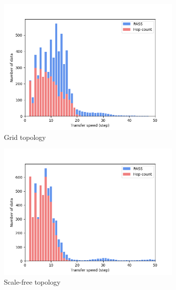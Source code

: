 \begin{figure}
    \centering
    \begin{subfigure}{0.48\textwidth}
        \includegraphics[width=\textwidth]{figures/dora_mesh/grid_speed.png}
        \caption{Grid topology}
        \label{results:grid_100_speed}
    \end{subfigure}
    \begin{subfigure}{0.48\textwidth}
        \includegraphics[width=\textwidth]{figures/dora_mesh/scale_speed.png}
        \caption{Scale-free topology}
        \label{results:scale_100_speed}
    \end{subfigure}
    \begin{subfigure}{0.48\textwidth}

\end{subfigure}
\end{figure}

